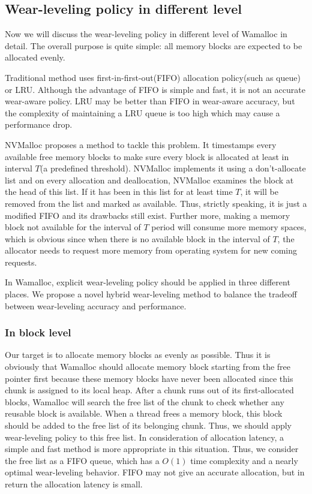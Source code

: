 \documentclass[10pt, conference, compsocconf]{IEEEtran}
\begin{document}
\subsection{Wear-leveling policy in different level}

Now we will discuss the wear-leveling policy in different level of Wamalloc in detail.
The overall purpose is quite simple: all memory blocks are expected to be allocated evenly.

Traditional method uses first-in-first-out(FIFO) allocation policy(such as queue) 
or LRU\cite{zhou2009durable}\cite{rodriguez2015write}.
Although the advantage of FIFO is simple and fast, it is not an accurate wear-aware policy.
LRU may be better than FIFO in wear-aware accuracy, but the complexity of maintaining a LRU queue is too high which may cause a performance drop.

NVMalloc\cite{moraru2013consistent} proposes a method to tackle this problem.
It timestamps every available free memory blocks to make sure every block is allocated at least in interval $T$(a predefined threshold).
NVMalloc implements it using a don't-allocate list and on every allocation and deallocation,
NVMalloc examines the block at the head of this list.
If it has been in this list for at least time $T$,
it will be removed from the list and marked as available.
Thus, strictly speaking, it is just a modified FIFO and its drawbacks still exist.
Further more, making a memory block not available for the interval of $T$ period will consume more memory spaces,
which is obvious since when there is no available block in the interval of $T$, 
the allocator needs to request more memory from operating system for new coming requests.

In Wamalloc, explicit wear-leveling policy should be applied in three different places. 
We propose a novel hybrid wear-leveling method to balance the tradeoff between wear-leveling accuracy and performance.

\subsubsection{In block level}
Our target is to allocate memory blocks as evenly as possible.
Thus it is obviously that Wamalloc should allocate memory block starting from the free pointer first
because these memory blocks have never been allocated since this chunk is assigned to its local heap.
After a chunk runs out of its first-allocated blocks, 
Wamalloc will search the free list of the chunk to check whether any reusable block is available.
When a thread frees a memory block, this block should be added to the free list of its belonging chunk.
Thus, we should apply wear-leveling policy to this free list.
In consideration of allocation latency, a simple and fast method is more appropriate in this situation.
Thus, we consider the free list as a FIFO queue,
which has a $O(1)$ time complexity and a nearly optimal wear-leveling behavior.
FIFO may not give an accurate allocation, but in return the allocation latency is small.
\end{document}
